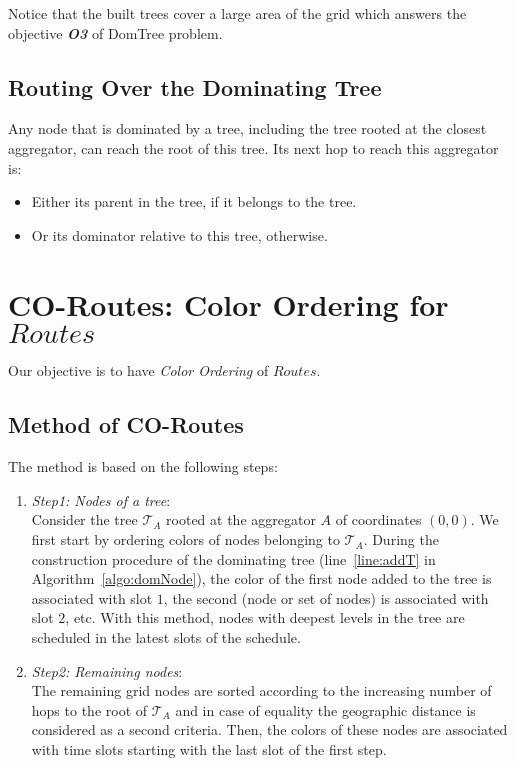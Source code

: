 Notice that the built trees cover a large area of the grid which answers the objective \textbf{\textit{O3}} of DomTree problem.


\subsection{Routing Over the Dominating Tree}
Any node that is dominated by a tree, including the tree rooted at the closest aggregator, can reach the root of this tree. Its next hop to reach this aggregator is:
\begin{itemize}
\item Either its parent in the tree, if it belongs to the tree.
\item Or its dominator relative to this tree, otherwise.
\end{itemize}

\section{CO-Routes: Color Ordering for $Routes$}\label{sec:ordering}
Our objective is to have \textit{Color Ordering} of $Routes$. 



\subsection{Method of CO-Routes}\label{sec:methOrder}
\begin{method}[CO-Routes]\label{meth:orderColor}

The method is based on the following steps:\begin{enumerate}
\item \textit{Step1: Nodes of a tree}:\\
Consider the tree $\mathcal{T}_A$ rooted at the aggregator $A$ of coordinates $(0,0)$. We first start by ordering colors of nodes belonging to $\mathcal{T}_A$.
During the construction procedure of the dominating tree (line~\ref{line:addT} in Algorithm~\ref{algo:domNode}), the color of the first node added to the tree is associated with slot $1$, the second (node or set of nodes) is associated with slot $2$, etc. With this method, nodes with deepest levels in the tree are scheduled in the latest slots of the schedule. \item \textit{Step2: Remaining nodes}: \\
The remaining grid nodes are sorted according to the increasing number of hops to the root of $\mathcal{T}_A$ and in case of equality the geographic distance is considered as a second criteria.
Then, the colors of these nodes are associated with time slots starting with the last slot of the first step.
\end{enumerate}
\end{method}

